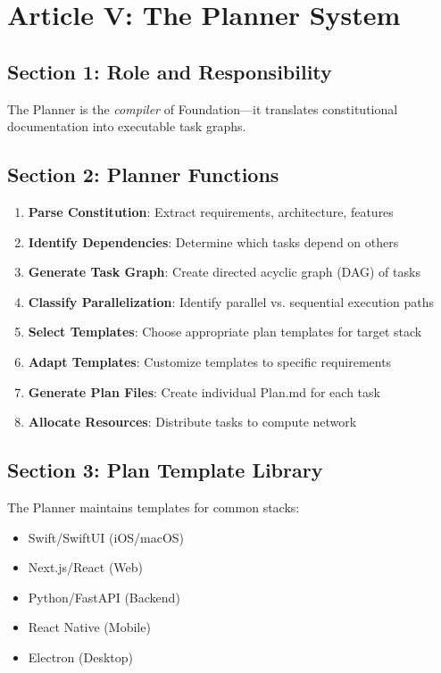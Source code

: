 \documentclass[12pt,letterpaper]{article}
\begin{document}
\section{Article V: The Planner System}

\subsection{Section 1: Role and Responsibility}

The Planner is the \textit{compiler} of Foundation—it translates constitutional documentation into executable task graphs.

\subsection{Section 2: Planner Functions}

\begin{enumerate}
    \item \textbf{Parse Constitution}: Extract requirements, architecture, features
    \item \textbf{Identify Dependencies}: Determine which tasks depend on others
    \item \textbf{Generate Task Graph}: Create directed acyclic graph (DAG) of tasks
    \item \textbf{Classify Parallelization}: Identify parallel vs. sequential execution paths
    \item \textbf{Select Templates}: Choose appropriate plan templates for target stack
    \item \textbf{Adapt Templates}: Customize templates to specific requirements
    \item \textbf{Generate Plan Files}: Create individual Plan.md for each task
    \item \textbf{Allocate Resources}: Distribute tasks to compute network
\end{enumerate}

\subsection{Section 3: Plan Template Library}

The Planner maintains templates for common stacks:

\begin{itemize}
    \item Swift/SwiftUI (iOS/macOS)
    \item Next.js/React (Web)
    \item Python/FastAPI (Backend)
    \item React Native (Mobile)
    \item Electron (Desktop)
\end{itemize}
\end{document}
